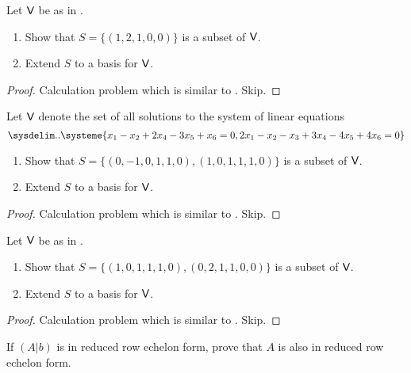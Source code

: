 \begin{exercise} \label{exercise 3.4.11}
Let \(\textsf{V}\) be as in .
\begin{enumerate}
\item Show that \(S = \{ (1 , 2, 1, 0, 0) \}\) is a \LID{} subset of \(\textsf{V}\).
\item Extend \(S\) to a basis for \(\textsf{V}\).
\end{enumerate}
\end{exercise}

\begin{proof}
Calculation problem which is similar to . Skip.
\end{proof}

\begin{exercise} \label{exercise 3.4.12}
Let \(\textsf{V}\) denote the set of all solutions to the system of linear equations
\[
    \sysdelim..\systeme{
        x_1 - x_2 + 2x_4 - 3x_5 + x_6 = 0,
        2x_1 - x_2 - x_3 + 3x_4 - 4x_5 + 4x_6 = 0
    }
\]
\begin{enumerate}
\item Show that \(S = \{ (0,-1,0,1,1,0), (1,0,1,1,1,0) \}\) is a \LID{} subset of \(\textsf{V}\).
\item Extend \(S\) to a basis for \(\textsf{V}\).
\end{enumerate}
\end{exercise}

\begin{proof}
Calculation problem which is similar to . Skip.
\end{proof}

\begin{exercise} \label{exercise 3.4.13}
Let \(\textsf{V}\) be as in .
\begin{enumerate}
\item Show that \(S = \{ (1,0,1,1,1,0), (0,2,1,1,0,0) \}\) is a \LID{} subset of \(\textsf{V}\).
\item Extend \(S\) to a basis for \(\textsf{V}\).
\end{enumerate}
\end{exercise}

\begin{proof}
Calculation problem which is similar to . Skip.
\end{proof}

\begin{exercise} \label{exercise 3.4.14}
If \((A|b)\) is in reduced row echelon form, prove that \(A\) is also in reduced row echelon form.
\end{exercise}

